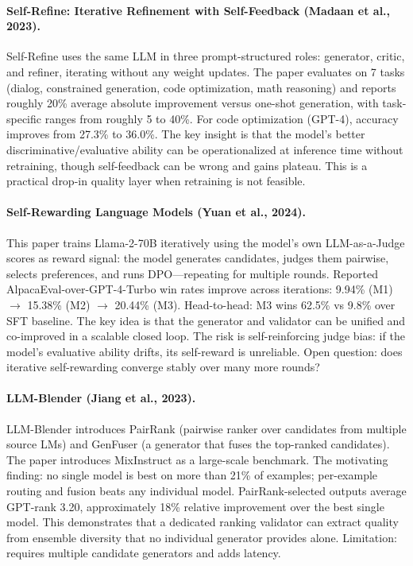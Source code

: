 \documentclass[11pt]{article}
\begin{document}
\paragraph{Self-Refine: Iterative Refinement with Self-Feedback (Madaan et al., 2023).}
Self-Refine uses the same LLM in three prompt-structured roles: generator, critic, and refiner, iterating without any weight updates. The paper evaluates on 7 tasks (dialog, constrained generation, code optimization, math reasoning) and reports roughly 20\% average absolute improvement versus one-shot generation, with task-specific ranges from roughly 5 to 40\%. For code optimization (GPT-4), accuracy improves from 27.3\% to 36.0\%. The key insight is that the model's better discriminative/evaluative ability can be operationalized at inference time without retraining, though self-feedback can be wrong and gains plateau. This is a practical drop-in quality layer when retraining is not feasible.

\paragraph{Self-Rewarding Language Models (Yuan et al., 2024).}
This paper trains Llama-2-70B iteratively using the model's own LLM-as-a-Judge scores as reward signal: the model generates candidates, judges them pairwise, selects preferences, and runs DPO---repeating for multiple rounds. Reported AlpacaEval-over-GPT-4-Turbo win rates improve across iterations: 9.94\% (M1) $\to$ 15.38\% (M2) $\to$ 20.44\% (M3). Head-to-head: M3 wins 62.5\% vs 9.8\% over SFT baseline. The key idea is that the generator and validator can be unified and co-improved in a scalable closed loop. The risk is self-reinforcing judge bias: if the model's evaluative ability drifts, its self-reward is unreliable. Open question: does iterative self-rewarding converge stably over many more rounds?

\paragraph{LLM-Blender (Jiang et al., 2023).}
LLM-Blender introduces PairRank (pairwise ranker over candidates from multiple source LMs) and GenFuser (a generator that fuses the top-ranked candidates). The paper introduces MixInstruct as a large-scale benchmark. The motivating finding: no single model is best on more than 21\% of examples; per-example routing and fusion beats any individual model. PairRank-selected outputs average GPT-rank 3.20, approximately 18\% relative improvement over the best single model. This demonstrates that a dedicated ranking validator can extract quality from ensemble diversity that no individual generator provides alone. Limitation: requires multiple candidate generators and adds latency.
\end{document}
